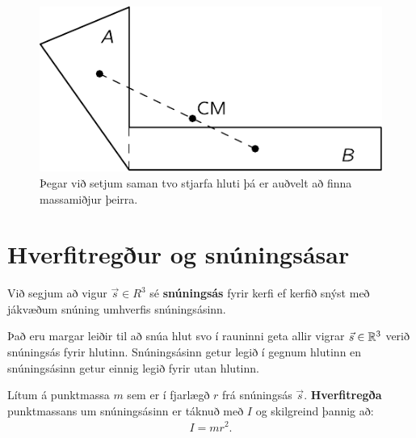 \ifdefined \wholebook \else\documentclass[oneside]{book}\usepackage{EdlBook}\graphicspath{{figures/}}
\begin{document}
\begin{figure}[H]
    \centering
    \includegraphics[scale=1]{figures/feyncm.pdf}
    \caption{Þegar við setjum saman tvo stjarfa hluti þá er auðvelt að finna massamiðjur þeirra.}
    \label{fig:feyncm}
\end{figure}


\section{Hverfitregður og snúningsásar}

\begin{tcolorbox}
\begin{definition}
Við segjum að vigur $\vec{s} \in R^3$ sé \textbf{snúningsás} fyrir kerfi ef kerfið snýst með jákvæðum snúning umhverfis snúningsásinn.
\end{definition}
\end{tcolorbox}

Það eru margar leiðir til að snúa hlut svo í rauninni geta allir vigrar $\vec{s} \in \mathbb{R}^3$ verið snúningsás fyrir hlutinn. Snúningsásinn getur legið í gegnum hlutinn en snúningsásinn getur einnig legið fyrir utan hlutinn. 

\begin{tcolorbox}
\begin{definition}
Lítum á punktmassa $m$ sem er í fjarlægð $r$ frá snúningsás $\vec{s}$. \textbf{Hverfitregða} punktmassans um snúningsásinn er táknuð með $I$ og skilgreind þannig að:
\begin{align*}
    I = mr^2.
\end{align*}
\end{definition}
\end{tcolorbox}
\end{document}

